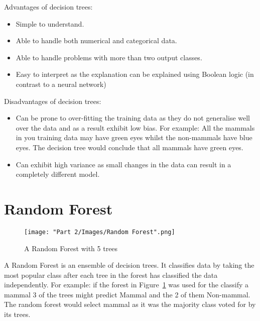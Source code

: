 		Advantages of decision trees:
			\begin{itemize}
				\item Simple to understand.
				\item Able to handle both numerical and categorical data.
				\item Able to handle problems with more than two output classes.
				\item Easy to interpret as the explanation can be explained using Boolean logic (in contrast to a neural network)
			\end{itemize}					
		
		Disadvantages of decision trees:
			\begin{itemize}
				\item Can be prone to over-fitting the training data as they do not generalise well over the data and as a result exhibit low bias. For example: All the mammals in you training data may have green eyes whilst the non-mammals have blue eyes. The decision tree would conclude that all mammals have green eyes.
				\item Can exhibit high variance as small changes in the data can result in a completely different model.
			\end{itemize}		
	
	\section{Random Forest}
		\begin{figure}[H]
			\texttt{[image: "Part 2/Images/Random Forest".png]}
			\centering
			\caption{A Random Forest with 5 trees}
    			\label{fig:randomForest}
		\end{figure}		
		
	A Random Forest is an ensemble of decision trees. It classifies data by taking the most popular class after each tree in the forest has classified the data independently. For example: if the forest in Figure~\ref{fig:randomForest} was used for the classify a mammal 3 of the trees might predict Mammal and the 2 of them Non-mammal. The random forest would select mammal as it was the majority class voted for by its trees.\\
	
